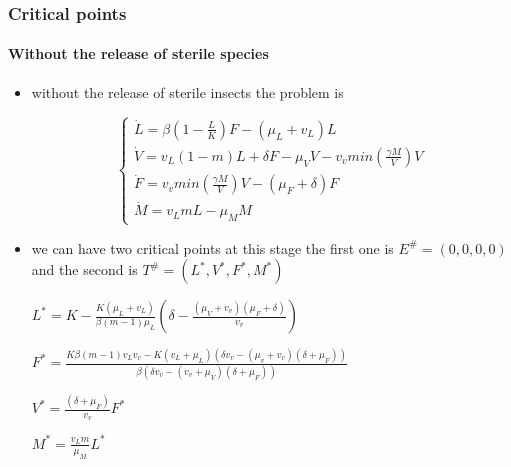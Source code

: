 \documentclass[light]{lutbeamer} %
\begin{document}
\begin{frame}[fragile]
\frametitle{Critical points}
\framesubtitle{Without the release of sterile species}
\begin{itemize}[<+->]
\item without the release of sterile insects the problem is 

$$\left\{\begin{array}{l}
\dot{L} =\beta\left(1-\frac{L}{K}\right) F-\left(\mu_L+v_L\right) L \\ \dot{V}=v_L(1-m) L +\delta F-\mu_V V - v_v min(\frac{\gamma M}{V} )V\\  \dot{F}= v_v min(\frac{\gamma M}{V} )V-(\mu_F+\delta) F  \\  \dot{M} =v_L m L-\mu_M M 
\end{array}\right.$$

\item we can have two critical points at this stage the first one is $E^\# =(0,0,0,0)$ and the second is $T^\#=(L^*,V^*,F^*,M^*)$

$L^*=K-\frac{K(\mu_L+v_L)}{\beta(m-1)\mu_L}(\delta-\frac{(\mu_V+v_v)(\mu_F+\delta)}{v_v})$

$F^*=\frac{K\beta (m-1)v_Lv_v-K(v_L+\mu_L)(\delta v_v-(\mu_v + v_v)(\delta + \mu_F))}{\beta(\delta v_v-(v_v+\mu_V)(\delta + \mu_F))}$

$V^*= \frac{(\delta+\mu_F)}{v_v}F^*$ 

$M^* =\frac{v_L m}{\mu_M } L^*$

\end{itemize}

\end{frame}
\end{document}
